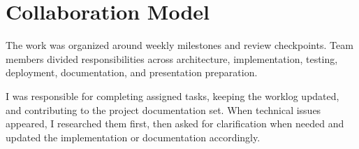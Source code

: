 \section{Collaboration Model}

The work was organized around weekly milestones and review checkpoints. Team
members divided responsibilities across architecture, implementation, testing,
deployment, documentation, and presentation preparation.

I was responsible for completing assigned tasks, keeping the worklog updated,
and contributing to the project documentation set. When technical issues
appeared, I researched them first, then asked for clarification when needed and
updated the implementation or documentation accordingly.
